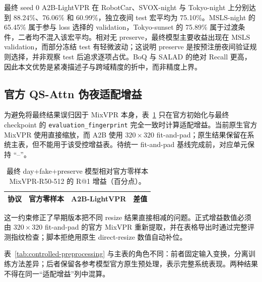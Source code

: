 \documentclass[UTF8,a4paper,11pt]{ctexart}
\begin{document}
最终 seed 0 A2B-LightVPR 在 RobotCar、SVOX-night 与 Tokyo-night 上分别达到 88.24\%、76.06\% 和 60.99\%，独立夜间 test 宏平均为 75.10\%。MSLS-night 的 65.45\% 属于参与 loss 选择的 validation，Tokyo-sunset 的 75.89\% 属于过渡条件，二者均不混入该宏平均。相对无 preserve，最终模型主要收益出现在 MSLS validation，而部分冻结 test 有轻微波动；这说明 preserve 是按预注册夜间验证规则选择，并非观察 test 后追求逐项占优。BoQ 与 SALAD 的绝对 Recall 更高，因此本文优势是紧凑描述子与跨域精度的折中，而非精度上界。

\subsection{官方 QS-Attn 伪夜适配增益}
为避免将最终结果误归因于 MixVPR 本身，表~\ref{tab:adaptation-gain} 只在官方初始化与最终 checkpoint 的 \texttt{evaluation\_fingerprint} 完全一致时计算适配增益。当前原生官方 MixVPR 使用直接缩放，而 A2B 使用 $320\times320$ fit-and-pad；原生结果保留在系统主表，但不能用于该受控增益表。待统一 fit-and-pad 基线完成前，对应单元保持 ``--''。
\begin{table}[htbp]
\centering
\caption{最终 day+fake+preserve 模型相对官方零样本 MixVPR-R50-512 的 R@1 增益（百分点）。}
\label{tab:adaptation-gain}
\begin{tabular}{lrrr}
\toprule
协议 & 官方零样本 & A2B-LightVPR & 差值\\
\midrule

\end{tabular}
\end{table}

这一约束修正了早期版本把不同 resize 结果直接相减的问题。正式增益数值必须由 $320\times320$ fit-and-pad 的官方 MixVPR 重新提取，并在表格导出时通过完整评测指纹检查；脚本拒绝用原生 direct-resize 数值自动补位。

\begin{table}[htbp]
\centering
\caption{统一 $320\times320$ fit-and-pad 的受控 R@1（\%）。MSLS-N 是 validation，Tokyo-S 是 transition。}
\label{tab:controlled-preprocessing}
\end{table}

表~\ref{tab:controlled-preprocessing} 与主表的角色不同：前者固定输入变换，分离训练方法差异；后者保留各参考模型官方原生预处理，表示完整系统表现。两种结果不得在同一“适配增益”列中混算。
\end{document}
